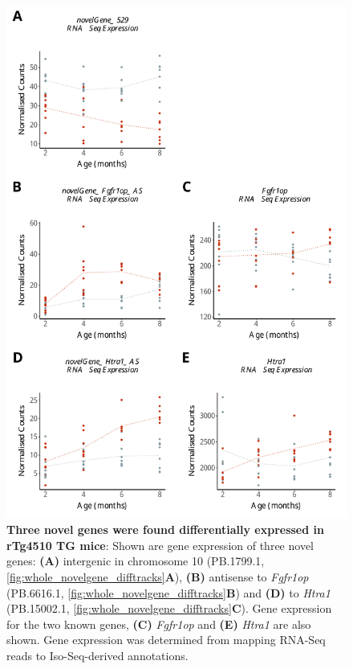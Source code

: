 \begin{figure}[!htp]
	\begin{center}
		\includegraphics[page=1,scale = 0.55]{Figures/NovelGeneExp.pdf}
	\end{center}
	\captionsetup{width=0.95\textwidth}
	\caption[Three novel genes were found differentially expressed in rTg4510 TG mice]%
	{\textbf{Three novel genes were found differentially expressed in rTg4510 TG mice}: Shown are gene expression of three novel genes: \textbf{(A)} intergenic in chromosome 10 (PB.1799.1, \cref{fig:whole_novelgene_difftracks}\textbf{A}), \textbf{(B)} antisense to \textit{Fgfr1op} (PB.6616.1, \cref{fig:whole_novelgene_difftracks}\textbf{B}) and \textbf{(D)} to \textit{Htra1} (PB.15002.1, \cref{fig:whole_novelgene_difftracks}\textbf{C}). Gene expression for the two known genes, \textbf{(C)} \textit{Fgfr1op} and \textbf{(E)} \textit{Htra1} are also shown. Gene expression was determined from mapping RNA-Seq reads to Iso-Seq-derived annotations.}   
	\label{fig:whole_novelgene_diffexp}
\end{figure}

